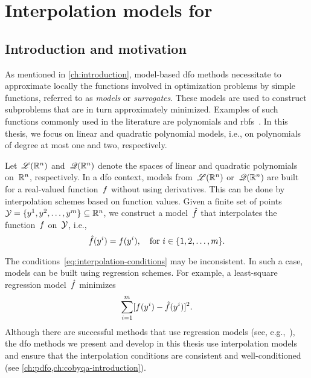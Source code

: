 %
%
%
\chapter{Interpolation models for }

\section{Introduction and motivation}

As mentioned in \cref{ch:introduction}, model-based \gls{dfo} methods necessitate to approximate locally the functions involved in optimization problems by simple functions, referred to as \emph{models} or \emph{surrogates}.
These models are used to construct subproblems that are in turn approximately minimized.
Examples of such functions commonly used in the literature are polynomials and \glspl{rbf}~\cite{Powell_2004a}.
In this thesis, we focus on linear and quadratic polynomial models, i.e., on polynomials of degree at most one and two, respectively.

Let~$\mathscr{L}(\mathbb{R}^n)$ and~$\mathscr{Q}(\mathbb{R}^n)$ denote the spaces of linear and quadratic polynomials on~$\mathbb{R}^n$, respectively.
In a \gls{dfo} context, models from~$\mathscr{L}(\mathbb{R}^n)$ or~$\mathscr{Q}(\mathbb{R}^n)$ are built for a real-valued function~$f$ without using derivatives.
This can be done by interpolation schemes based on function values.
Given a finite set of points~$\xpt = \set{y^1, y^2, \dots, y^m} \subseteq \R^n$, we construct a model~$\objm$ that interpolates the function~$f$ on~$\xpt$, i.e.,
\begin{equation}
    \label{eq:interpolation-conditions}
    \objm(y^i) = \obj(y^i), \quad \text{for~$i \in \set{1, 2, \dots, m}$}.
\end{equation}

The conditions~\cref{eq:interpolation-conditions} may be inconsistent.
In such a case, models can be built using regression schemes.
For example, a least-square regression model~$\objm$ minimizes
\begin{equation*}
    \sum_{i = 1}^m [\obj(y^i) - \objm(y^i)]^2.
\end{equation*}
Although there are successful methods that use regression models (see, e.g.,~\cite{Billups_Larson_Graf_2013,Conn_Scheinberg_Vicente_2008b}), the \gls{dfo} methods we present and develop in this thesis use interpolation models and ensure that the interpolation conditions are consistent and well-conditioned (see \cref{ch:pdfo,ch:cobyqa-introduction}).

